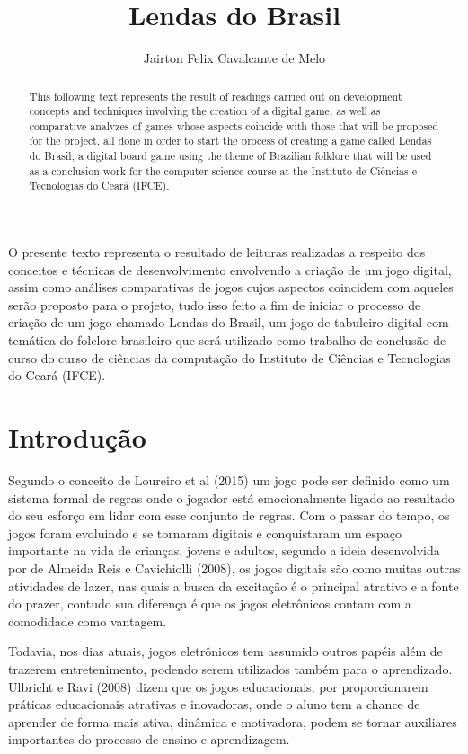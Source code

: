 \documentclass[12pt]{article}
\title{Lendas do Brasil}
\author{Jairton Felix Cavalcante de Melo\inst{1} }
\begin{document}
 

\maketitle

\begin{abstract}
  This following text represents the result of readings carried out on development concepts and techniques involving the creation of a digital game, as well as comparative analyzes of games whose aspects coincide with those that will be proposed for the project, all done in order to start the process of creating a game called Lendas do Brasil, a digital board game using the theme of Brazilian folklore that will be used as a conclusion work for the computer science course at the Instituto de Ciências e Tecnologias do Ceará (IFCE).
\end{abstract}
     
\begin{resumo} 
 O presente texto representa o resultado de leituras realizadas a respeito dos conceitos e técnicas de desenvolvimento envolvendo a criação de um jogo digital, assim como análises comparativas de jogos cujos aspectos coincidem com aqueles serão proposto para o projeto, tudo isso feito a fim de iniciar o processo de criação de um jogo  chamado Lendas do Brasil, um jogo de tabuleiro digital com temática do folclore brasileiro que será utilizado como trabalho de conclusão de curso do curso de ciências da computação do Instituto de Ciências e Tecnologias do Ceará (IFCE).
\end{resumo}


\section{Introdução}

Segundo o conceito de Loureiro et al (2015) um jogo pode ser definido como um sistema
formal de regras onde o jogador está emocionalmente ligado ao resultado do seu esforço em lidar com esse conjunto de regras. Com o passar do tempo, os jogos foram evoluindo e se tornaram digitais e conquistaram um espaço importante na vida de crianças, jovens e adultos, segundo a ideia desenvolvida por de Almeida Reis e Cavichiolli (2008), os jogos digitais são como muitas outras atividades de lazer, nas quais a busca da excitação  é o principal atrativo e a fonte do prazer, contudo sua diferença é que os jogos eletrônicos contam com a comodidade como vantagem. 

Todavia, nos dias atuais, jogos eletrônicos tem assumido outros papéis além de trazerem entretenimento, podendo serem utilizados também para o aprendizado.  Ulbricht e Ravi (2008) dizem que os jogos educacionais, por proporcionarem práticas educacionais atrativas e inovadoras, onde o aluno tem a chance de aprender de forma mais ativa, dinâmica e motivadora, podem se tornar auxiliares importantes do processo de ensino e aprendizagem.
\end{document}
